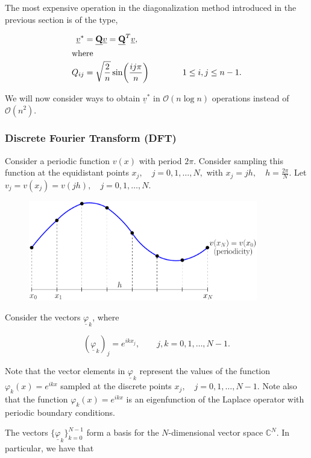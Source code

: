 \documentclass[11pt]{article}
\begin{document}
The most expensive operation in the diagonalization method introduced in the previous section is of the type,

\begin{align*}
  \underline{v}^* &= \underline{\mathbf{Q}} \underline{v} = \underline{\mathbf{Q}}^T \underline{v}, \\
  \intertext{where}
  Q_{ij} &= \sqrt{\frac{2}{n}} \sin \biggl( \frac{ij \pi}{n} \biggr) \qquad \qquad 1 \leq i,j \leq n-1.
\end{align*}

We will now consider ways to obtain $\underline{v}^*$ in $\mathcal{O}(n \log n)$ operations instead of $\mathcal{O}(n^2)$.


\subsubsection{Discrete Fourier Transform (DFT)}

Consider a periodic function $v(x)$ with period $2 \pi$. Consider sampling this function at the equidistant points $x_j, \quad j=0,1,\ldots,N,$ with $x_j=j h, \quad h=\frac{2 \pi}{N}$. Let $v_j = v(x_j) = v(j h), \quad j=0,1,\ldots,N$.

\begin{figure}[h]
  \centering
  \includegraphics[width=10cm]{PeriodicFunction}
\end{figure}


Consider the vectors $\underline{\varphi}_k$, where

\begin{equation*}
  (\underline{\varphi}_k)_j = e^{i k x_j}, \qquad j,k=0,1,\ldots,N-1.
\end{equation*}

Note that the vector elements in $\underline{\varphi}_k$ represent the values of the function $\varphi_k(x) = e^{ikx}$ sampled at the discrete points $x_j, \quad j=0,1,\ldots,N-1$. Note also that the function $\varphi_k(x) = e^{ikx}$ is an eigenfunction of the Laplace operator with periodic boundary conditions.

The vectors $\{ \underline{\varphi}_k \}_{k=0}^{N-1}$ form a basis for the $N$-dimensional  vector space $\mathbb{C}^N$. In particular, we have that 
\end{document}
